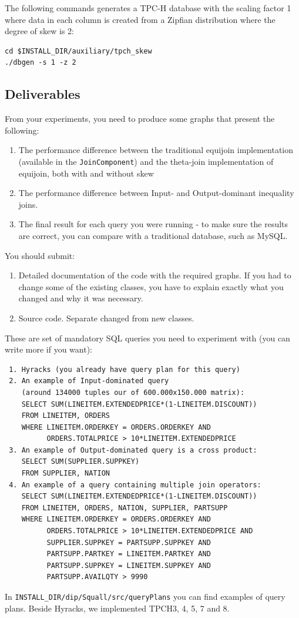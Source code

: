\documentclass[a4paper,10pt]{article}
\begin{document}
The following commands generates a TPC-H database with the scaling factor 1 where data in each column is created from a Zipfian distribution where the degree of skew is 2:
\begin{verbatim}
cd $INSTALL_DIR/auxiliary/tpch_skew
./dbgen -s 1 -z 2
\end{verbatim}

\subsection{Deliverables}\label{deliverables}
From your experiments, you need to produce some graphs that present the following:
\begin{enumerate}
 \item The performance difference between the traditional equijoin implementation (available in the \verb#JoinComponent#) and the theta-join implementation of equijoin, both with and without skew
 \item The performance difference between Input- and Output-dominant inequality joins.
 \item The final result for each query you were running - to make sure the results are correct, you can compare with a traditional database, such as MySQL.
\end{enumerate}

You should submit:
\begin{enumerate}
 \item Detailed documentation of the code with the required graphs. If you had to change some of the existing classes, you have to explain exactly what you changed and why it was necessary.
 \item Source code. Separate changed from new classes.
\end{enumerate}

These are set of mandatory SQL queries you need to experiment with (you can write more if you want):
\begin{verbatim}
 1. Hyracks (you already have query plan for this query)
 2. An example of Input-dominated query 
    (around 134000 tuples our of 600.000x150.000 matrix):
    SELECT SUM(LINEITEM.EXTENDEDPRICE*(1-LINEITEM.DISCOUNT))
    FROM LINEITEM, ORDERS
    WHERE LINEITEM.ORDERKEY = ORDERS.ORDERKEY AND 
          ORDERS.TOTALPRICE > 10*LINEITEM.EXTENDEDPRICE
 3. An example of Output-dominated query is a cross product:
    SELECT SUM(SUPPLIER.SUPPKEY)
    FROM SUPPLIER, NATION
 4. An example of a query containing multiple join operators:
    SELECT SUM(LINEITEM.EXTENDEDPRICE*(1-LINEITEM.DISCOUNT))
    FROM LINEITEM, ORDERS, NATION, SUPPLIER, PARTSUPP
    WHERE LINEITEM.ORDERKEY = ORDERS.ORDERKEY AND 
          ORDERS.TOTALPRICE > 10*LINEITEM.EXTENDEDPRICE AND
          SUPPLIER.SUPPKEY = PARTSUPP.SUPPKEY AND
          PARTSUPP.PARTKEY = LINEITEM.PARTKEY AND 
          PARTSUPP.SUPPKEY = LINEITEM.SUPPKEY AND
          PARTSUPP.AVAILQTY > 9990

\end{verbatim}
In \verb#INSTALL_DIR/dip/Squall/src/queryPlans# you can find examples of query plans. Beside Hyracks, we implemented TPCH3, 4, 5, 7 and 8.
\end{document}
